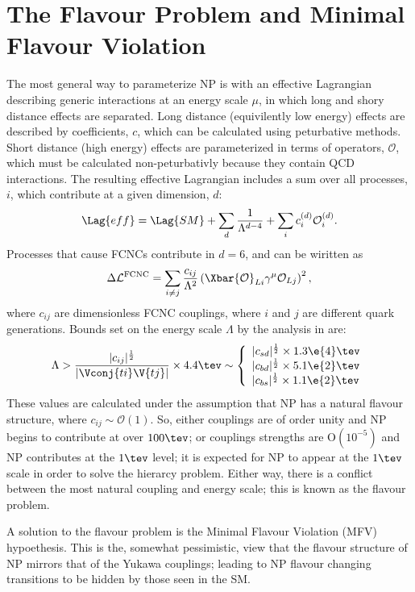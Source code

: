 \section{The Flavour Problem and Minimal Flavour Violation}

The most general way to parameterize NP is with an effective Lagrangian describing generic
interactions at an energy scale $\mu$, in which long and shory distance effects are separated.
Long distance (equivilently low energy) effects are described by coefficients, $c$, which can be
calculated using peturbative methods.
Short distance (high energy) effects are parameterized in terms of operators, $\mathcal{O}$,
which must be calculated non-peturbativly because they contain QCD interactions.
The resulting effective Lagrangian includes a sum over all processes, $i$, which contribute at a
given dimension, $d$:
\begin{equation}
  \Lag{eff}
  =
  \Lag{SM} + \sum_d\frac1{\Lambda^{d-4}}
  + \sum_ic_i^{(d)}\mathcal{O}_i^{(d)}.
\end{equation}
Processes that cause FCNCs contribute in $d=6$, and can be wiritten as
\begin{equation}
  \Delta\mathcal{L}^\mathrm{FCNC}
  =
  \sum_{i\neq j}\frac{c_{ij}}{\Lambda^2}
  \left(\Xbar{\mathcal{O}}_{Li}\gamma^\mu\mathcal{O}_{Lj}\right)^2,
\end{equation}
where $c_{ij}$ are dimensionless FCNC couplings, where $i$ and $j$ are different quark generations.
Bounds set on the energy scale $\Lambda$ by the analysis in  are:
\begin{equation}
  \Lambda > \frac{|c_{ij}|^\frac12}{|\Vconj{ti}\V{tj}|}\times4.4\tev
  \sim
  \left\{
    \begin{array}{l}
      |c_{sd}|^\frac12\times 1.3\e{4}\tev \\
      |c_{bd}|^\frac12\times 5.1\e{2}\tev \\
      |c_{bs}|^\frac12\times 1.1\e{2}\tev \\
    \end{array}\right.
\end{equation}
These values are calculated under the assumption that NP has a natural flavour structure, where
$c_{ij}\sim\mathcal{O}(1)$.
So, either couplings are of order unity and NP begins to contribute at over $100\tev$; or couplings
strengths are $\mathrm{O}(10^{-5})$ and NP contributes at the $1\tev$ level;
it is expected for NP to appear at the $1\tev$ scale in order to solve the hierarcy problem.
Either way, there is a conflict between the most natural coupling and energy scale; this is known
as the flavour problem.

A solution to the flavour problem is the Minimal Flavour Violation (MFV) hypoethesis.
This is the, somewhat pessimistic, view that the flavour structure of NP mirrors that of the Yukawa
couplings; leading to NP flavour changing transitions to be hidden by those seen in the SM.



